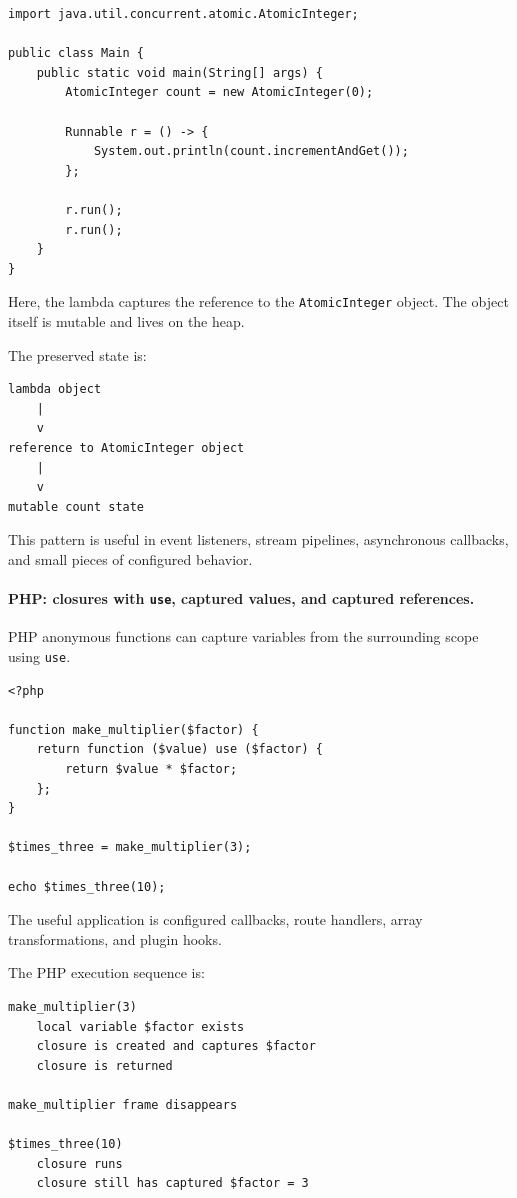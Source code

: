 \begin{verbatim}
import java.util.concurrent.atomic.AtomicInteger;

public class Main {
    public static void main(String[] args) {
        AtomicInteger count = new AtomicInteger(0);

        Runnable r = () -> {
            System.out.println(count.incrementAndGet());
        };

        r.run();
        r.run();
    }
}
\end{verbatim}

Here, the lambda captures the reference to the \texttt{AtomicInteger} object. The object itself is mutable and lives on the heap.

The preserved state is:

\begin{verbatim}
lambda object
    |
    v
reference to AtomicInteger object
    |
    v
mutable count state
\end{verbatim}

This pattern is useful in event listeners, stream pipelines, asynchronous callbacks, and small pieces of configured behavior.

\paragraph{PHP: closures with \texttt{use}, captured values, and captured references.}

PHP anonymous functions can capture variables from the surrounding scope using \texttt{use}.

\begin{verbatim}
<?php

function make_multiplier($factor) {
    return function ($value) use ($factor) {
        return $value * $factor;
    };
}

$times_three = make_multiplier(3);

echo $times_three(10);
\end{verbatim}

The useful application is configured callbacks, route handlers, array transformations, and plugin hooks.

The PHP execution sequence is:

\begin{verbatim}
make_multiplier(3)
    local variable $factor exists
    closure is created and captures $factor
    closure is returned

make_multiplier frame disappears

$times_three(10)
    closure runs
    closure still has captured $factor = 3
\end{verbatim}

